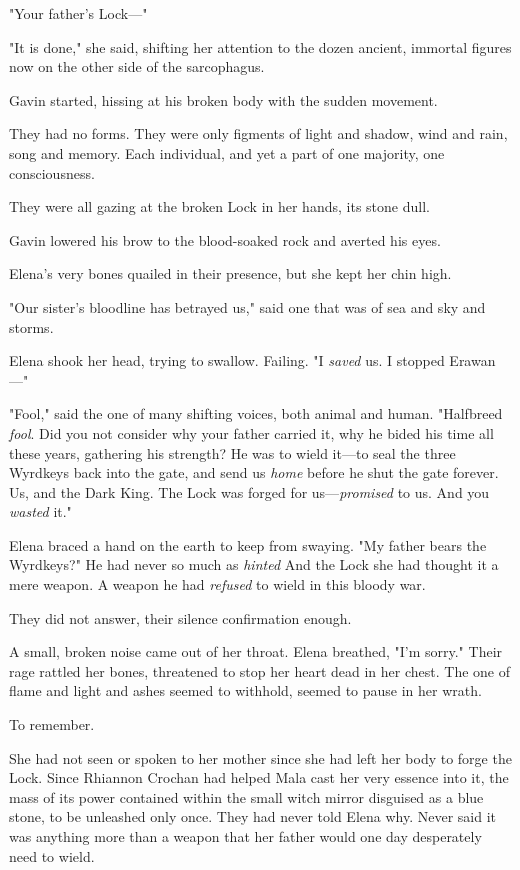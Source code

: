 "Your father's Lock---"

"It is done," she said, shifting her attention to the dozen ancient, immortal figures now on the other side of the sarcophagus.

Gavin started, hissing at his broken body with the sudden movement.

They had no forms. They were only figments of light and shadow, wind and rain, song and memory. Each individual, and yet a part of one majority, one consciousness.

They were all gazing at the broken Lock in her hands, its stone dull.

Gavin lowered his brow to the blood-soaked rock and averted his eyes.

Elena's very bones quailed in their presence, but she kept her chin high.

"Our sister's bloodline has betrayed us," said one that was of sea and sky and storms.

Elena shook her head, trying to swallow. Failing. "I \emph{saved} us. I stopped Erawan---"

"Fool," said the one of many shifting voices, both animal and human. "Halfbreed \emph{fool}. Did you not consider why your father carried it, why he bided his time all these years, gathering his strength? He was to wield it---to seal the three Wyrdkeys back into the gate, and send us \emph{home} before he shut the gate forever. Us, and the Dark King. The Lock was forged for us---\emph{promised} to us. And you
\emph{wasted} it."

Elena braced a hand on the earth to keep from swaying. "My father bears the Wyrdkeys?" He had never so much as \emph{hinted } And the Lock  she had thought it a mere weapon. A weapon he had
\emph{refused} to wield in this bloody war.

They did not answer, their silence confirmation enough.

A small, broken noise came out of her throat. Elena breathed, "I'm sorry." Their rage rattled her bones, threatened to stop her heart dead in her chest. The one of flame and light and ashes seemed to withhold, seemed to pause in her wrath.

To remember.

She had not seen or spoken to her mother since she had left her body to forge the Lock. Since Rhiannon Crochan had helped Mala cast her very essence into it, the mass of its power contained within the small witch mirror disguised as a blue stone, to be unleashed only once. They had never told Elena why. Never said it was anything more than a weapon that her father would one day desperately need to wield.

